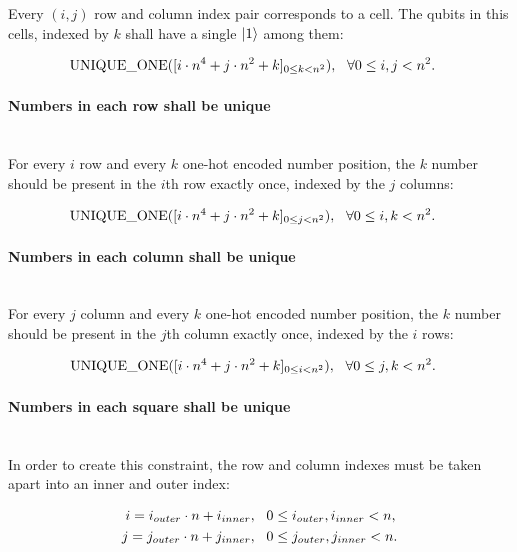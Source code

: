 Every $(i,j)$ row and column index pair corresponds to a cell. The qubits in this cells, indexed by $k$ shall have a single $\ket{1}$ among them:

\begin{align*}
    \text{UNIQUE\_ONE}([i\cdot{}n^4 + j\cdot{}n^2 + k]_{0\leq{}k<n^2}), & \hspace{3mm} \forall{}0\leq{}i,j<n^2.
\end{align*}

\paragraph{Numbers in each row shall be unique}\mbox{}\\

For every $i$ row and every $k$ one-hot encoded number position, the $k$ number should be present in the $i$th row exactly once, indexed by the $j$ columns:

\begin{align*}
    \text{UNIQUE\_ONE}([i\cdot{}n^4 + j\cdot{}n^2 + k]_{0\leq{}j<n^2}), & \hspace{3mm} \forall{}0\leq{}i,k<n^2.
\end{align*}

\paragraph{Numbers in each column shall be unique}\mbox{}\\

For every $j$ column and every $k$ one-hot encoded number position, the $k$ number should be present in the $j$th column exactly once, indexed by the $i$ rows:

\begin{align*}
    \text{UNIQUE\_ONE}([i\cdot{}n^4 + j\cdot{}n^2 + k]_{0\leq{}i<n^2}), & \hspace{3mm} \forall{}0\leq{}j,k<n^2.
\end{align*}

\paragraph{Numbers in each square shall be unique}\mbox{}\\

In order to create this constraint, the row and column indexes must be taken apart into an inner and outer index:

\begin{align*}
i = i_{outer}\cdot{}n + i_{inner},\hspace{3mm}& 0\leq{}i_{outer},i_{inner}<n, \\
j = j_{outer}\cdot{}n + j_{inner},\hspace{3mm}& 0\leq{}j_{outer},j_{inner}<n. \\
\end{align*}

